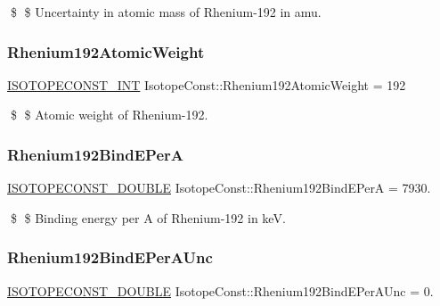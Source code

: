 \$ \$ Uncertainty in atomic mass of Rhenium-\/192 in amu. \mbox{\label{group___isotope_const-_rhenium-_re192_ga0f294fa19cf983bf09a7be964d0ae285}} 
\subsubsection{\texorpdfstring{Rhenium192\+Atomic\+Weight}{Rhenium192AtomicWeight}}
{\footnotesize\ttfamily \mbox{\hyperlink{group___isotope_const-_macros_ga5f18360b3e99483a35c32d789e62621c}{I\+S\+O\+T\+O\+P\+E\+C\+O\+N\+S\+T\+\_\+\+I\+NT}} Isotope\+Const\+::\+Rhenium192\+Atomic\+Weight = 192}

\$ \$ Atomic weight of Rhenium-\/192. \mbox{\label{group___isotope_const-_rhenium-_re192_ga4d8e7efb5fd8bf903d62fb1fc3276bd3}} 
\subsubsection{\texorpdfstring{Rhenium192\+Bind\+E\+PerA}{Rhenium192BindEPerA}}
{\footnotesize\ttfamily \mbox{\hyperlink{group___isotope_const-_macros_ga8f45a7272ce02c0b4c65c44636ed719a}{I\+S\+O\+T\+O\+P\+E\+C\+O\+N\+S\+T\+\_\+\+D\+O\+U\+B\+LE}} Isotope\+Const\+::\+Rhenium192\+Bind\+E\+PerA = 7930.}

\$ \$ Binding energy per A of Rhenium-\/192 in keV. \mbox{\label{group___isotope_const-_rhenium-_re192_ga537d89c80ba3e20209f6308b3e21559b}} 
\subsubsection{\texorpdfstring{Rhenium192\+Bind\+E\+Per\+A\+Unc}{Rhenium192BindEPerAUnc}}
{\footnotesize\ttfamily \mbox{\hyperlink{group___isotope_const-_macros_ga8f45a7272ce02c0b4c65c44636ed719a}{I\+S\+O\+T\+O\+P\+E\+C\+O\+N\+S\+T\+\_\+\+D\+O\+U\+B\+LE}} Isotope\+Const\+::\+Rhenium192\+Bind\+E\+Per\+A\+Unc = 0.}

